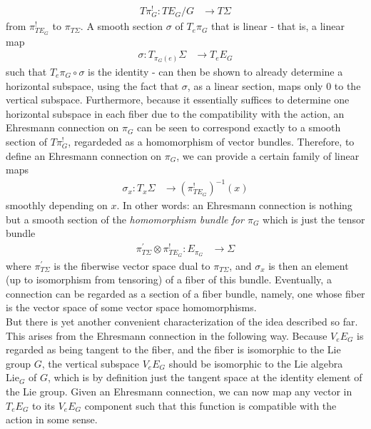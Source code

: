 \begin{enumerate}
\begin{align*}
  T\pi_{G}^{!}
  \colon
  TE_{G}
  \slash
  G
  &\rightarrow
  T\Sigma
\end{align*}
from $\pi_{TE_{G}}^{!}$ to $\pi_{T\Sigma}$.
A smooth section $\sigma$ of $T_{e}\pi_{G}$ that is linear - that is, a linear map
\begin{align*}
  \sigma
  \colon
  T_{\pi_{G}(e)}\Sigma
  &\rightarrow
  T_{e}E_{G}
\end{align*}
such that $T_{e}\pi_{G} \circ \sigma$ is the identity - can then be shown to already determine a horizontal subspace, using the fact that $\sigma$, as a linear section, maps only $0$ to the vertical subspace.
Furthermore, because it essentially suffices to determine one horizontal subspace in each fiber due to the compatibility with the action, an Ehresmann connection on $\pi_{G}$ can be seen to correspond exactly to a smooth section of $T\pi_{G}^{!}$, regardeded as a homomorphism of vector bundles.
Therefore, to define an Ehresmann connection on $\pi_{G}$, we can provide a certain family of linear maps
\begin{align*}
  \sigma_{x}
  \colon
  T_{x}\Sigma
  &\rightarrow
  \left(
    \pi_{TE_{G}}^{!}
  \right)^{-1}
  (x)
\end{align*}
smoothly depending on $x$.
In other words: an Ehresmann connection is nothing but a smooth section of the \textit{homomorphism bundle for $\pi_{G}$} which is just the tensor bundle
\begin{align*}
  \pi_{T\Sigma}^{\prime}
  \otimes
  \pi_{TE_{G}}^{!}
  \colon
  E_{\pi_{G}}
  &\rightarrow
  \Sigma
\end{align*}
where $\pi_{T\Sigma}^{\prime}$ is the fiberwise vector space dual to $\pi_{T\Sigma}$, and $\sigma_{x}$ is then an element (up to isomorphism from tensoring) of a fiber of this bundle.
Eventually, a connection can be regarded as a section of a fiber bundle, namely, one whose fiber is the vector space of some vector space homomorphisms.
\\
But there is yet another convenient characterization of the idea described so far.
This arises from the Ehresmann connection in the following way.
Because $V_{e}E_{G}$ is regarded as being tangent to the fiber, and the fiber is isomorphic to the Lie group $G$, the vertical subspace $V_{e}E_{G}$ should be isomorphic to the Lie algebra $\mathrm{Lie}_{G}$ of $G$, which is by definition just the tangent space at the identity element of the Lie group.
Given an Ehresmann connection, we can now map any vector in $T_{e}E_{G}$ to its $V_{e}E_{G}$ component such that this function is compatible with the action in some sense.

\end{enumerate}
